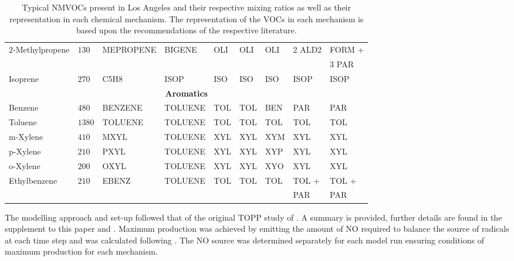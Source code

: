 \begin{table}
\begin{center}
\begin{tabular}{lllllllll}
            \multirow{2}{*}{$2$-Methylpropene} & \multirow{2}{*}{$130$} & \multirow{2}{*}{MEPROPENE} & \multirow{2}{*}{BIGENE} & \multirow{2}{*}{OLI} & \multirow{2}{*}{OLI} & \multirow{2}{*}{OLI} & \multirow{2}{*}{$2$ ALD2} & FORM + \\ & & & & & & & & \hspace{3mm}$3$ PAR \\
            Isoprene & $270$ & C5H8 & ISOP & ISO & ISO & ISO & ISOP & ISOP \\ \hline
            \multicolumn{9}{c}{\textbf{Aromatics}} \\ \hline 
            Benzene & $480$ & BENZENE & TOLUENE & TOL & TOL & BEN & PAR & PAR \\
            Toluene & $1380$ & TOLUENE & TOLUENE & TOL & TOL & TOL & TOL & TOL \\
            m-Xylene & $410$ & MXYL & TOLUENE & XYL & XYL & XYM & XYL & XYL \\
            p-Xylene & $210$ & PXYL & TOLUENE & XYL & XYL & XYP & XYL & XYL \\
            o-Xylene & $200$ & OXYL & TOLUENE & XYL & XYL & XYO & XYL & XYL \\
            \multirow{2}{*}{Ethylbenzene} & \multirow{2}{*}{$210$} & \multirow{2}{*}{EBENZ} & \multirow{2}{*}{TOLUENE} & \multirow{2}{*}{TOL} & \multirow{2}{*}{TOL} & \multirow{2}{*}{TOL} & TOL + & TOL + \\ & & & & & & & \hspace{3mm}PAR & \hspace{3mm}PAR \\ \hline \hline
        \end{tabular}
    \end{center}
    \caption{Typical NMVOCs present in Los Angeles and their respective mixing ratios \citep{Baker:2008} as well as their representation in each chemical mechanism. The representation of the VOCs in each mechanism is based upon the recommendations of the respective literature.}
    \label{t:initial_conditions}
\end{table}

The modelling approach and set-up followed that of the original TOPP study of \citet{Butler:2011}.
A summary is provided, further details are found in the supplement to this paper and \citep{Butler:2011}. 
Maximum  production was achieved by emitting the amount of NO required to balance the source of radicals at each time step and was calculated following \citet{Kleinman:1991}. 
The NO source was determined separately for each model run ensuring conditions of maximum  production for each mechanism.

